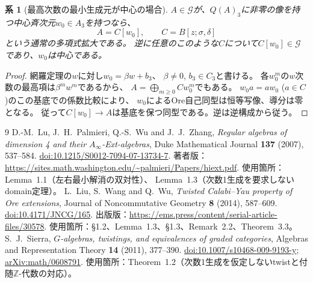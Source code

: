 \documentclass[11pt,a4paper]{ltjsarticle}
\newtheorem{corollary}[theorem]{系}
\theoremstyle{definition}
\newcommand{\ZZ}{\mathbb Z}
\newcommand{\Gclass}{\mathcal G}
\begin{document}
\begin{corollary}[最高次数の最小生成元が中心の場合]\label{cor:central-generator}
$A\in\Gclass$が、$Q(A)_3$に非零の像を持つ中心斉次元$w_0\in A_3$を持つなら、
\[
A=C[w_0],\qquad C=B[z;\sigma,\delta]
\]
という通常の多項式拡大である。
逆に任意のこのような$C$について$C[w_0]\in\Gclass$であり、$w_0$は中心である。
\end{corollary}
\begin{proof}
網羅定理の$w$に対し$w_0=\beta w+b_3$、
$\beta\ne0$, $b_3\in C_3$と書ける。
各$w_0^m$の$w$次数の最高項は$\beta^m w^m$であるから、
$A=\bigoplus_{m\geq0}Cw_0^m$でもある。
$w_0a=aw_0$ ($a\in C$)のこの基底での係数比較により、
$w_0$によるOre自己同型は恒等写像、導分は零となる。
従って$C[w_0]\to A$は基底を保つ同型である。逆は逆構成から従う。
\end{proof}
\begingroup
\small
\begin{thebibliography}{9}
D.-M.~Lu, J.~H.~Palmieri, Q.-S.~Wu and J.~J.~Zhang,
\emph{Regular algebras of dimension 4 and their $A_\infty$-Ext-algebras},
Duke Mathematical Journal \textbf{137} (2007), 537--584.
\href{https://doi.org/10.1215/S0012-7094-07-13734-7}{doi:10.1215/S0012-7094-07-13734-7}.
著者版：\url{https://sites.math.washington.edu/~palmieri/Papers/hiext.pdf}.
使用箇所：Lemma~1.1（左右最小解消の双対性）、
Lemma~1.3（次数1生成を要求しないdomain定理）。
L.~Liu, S.~Wang and Q.~Wu,
\emph{Twisted Calabi--Yau property of Ore extensions},
Journal of Noncommutative Geometry \textbf{8} (2014), 587--609.
\href{https://doi.org/10.4171/JNCG/165}{doi:10.4171/JNCG/165}.
出版版：\url{https://ems.press/content/serial-article-files/30578}.
使用箇所：\S1.2、Lemma~1.3、\S1.3、Remark~2.2、Theorem~3.3。
S.~J.~Sierra,
\emph{$G$-algebras, twistings, and equivalences of graded categories},
Algebras and Representation Theory \textbf{14} (2011), 377--390.
\href{https://doi.org/10.1007/s10468-009-9193-y}{doi:10.1007/s10468-009-9193-y};
\href{https://arxiv.org/abs/math/0608791}{arXiv:math/0608791}.
使用箇所：Theorem~1.2（次数1生成を仮定しないtwistと付随$\ZZ$-代数の対応）。
\end{thebibliography}
\endgroup
\end{document}
